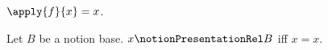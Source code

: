 

\begin{definition}\label{notion_presentation_apply_definition}
    $\apply{f}{x}=x$.
\end{definition}

\begin{definition}\label{notion_presentation_relation_definition}
    Let $B$ be a notion base.
    $x\notionPresentationRel B$ iff $x=x$.
\end{definition}
